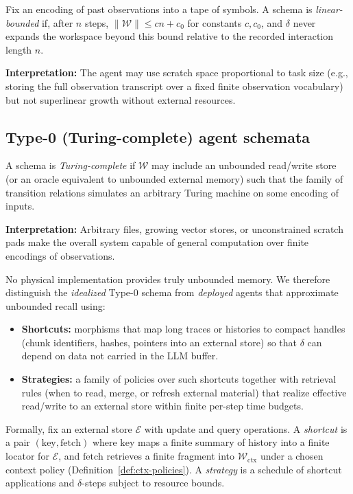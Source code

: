 \begin{definition}
\label{def:type1}
Fix an encoding of past observations into a tape of symbols. A schema is \emph{linear-bounded} if, after $n$ steps, $\lVert \mathcal{W} \rVert \le c n + c_0$ for constants $c,c_0$, and $\delta$ never expands the workspace beyond this bound relative to the recorded interaction length $n$.
\end{definition}

\textbf{Interpretation:} The agent may use scratch space proportional to task size (e.g., storing the full observation transcript over a fixed finite observation vocabulary) but not superlinear growth without external resources.

\subsection{Type-0 (Turing-complete) agent schemata}

\begin{definition}
\label{def:type0}
A schema is \emph{Turing-complete} if $\mathcal{W}$ may include an unbounded read/write store (or an oracle equivalent to unbounded external memory) such that the family of transition relations simulates an arbitrary Turing machine on some encoding of inputs.
\end{definition}

\textbf{Interpretation:} Arbitrary files, growing vector stores, or unconstrained scratch pads make the overall system capable of general computation over finite encodings of observations.

\begin{definition}
\label{def:shortcuts}
No physical implementation provides truly unbounded memory. We therefore distinguish the \emph{idealized} Type-0 schema from \emph{deployed} agents that approximate unbounded recall using:
\begin{itemize}
  \item \textbf{Shortcuts:} morphisms that map long traces or histories to compact handles (chunk identifiers, hashes, pointers into an external store) so that $\delta$ can depend on data not carried in the LLM buffer.
  \item \textbf{Strategies:} a family of policies over such shortcuts together with retrieval rules (when to read, merge, or refresh external material) that realize effective read/write to an external store within finite per-step time budgets.
\end{itemize}
Formally, fix an external store $\mathcal{E}$ with update and query operations. A \emph{shortcut} is a pair $(\mathrm{key},\mathrm{fetch})$ where $\mathrm{key}$ maps a finite summary of history into a finite locator for $\mathcal{E}$, and $\mathrm{fetch}$ retrieves a finite fragment into $\mathcal{W}_{\mathrm{ctx}}$ under a chosen context policy (Definition~\ref{def:ctx-policies}). A \emph{strategy} is a schedule of shortcut applications and $\delta$-steps subject to resource bounds.
\end{definition}

